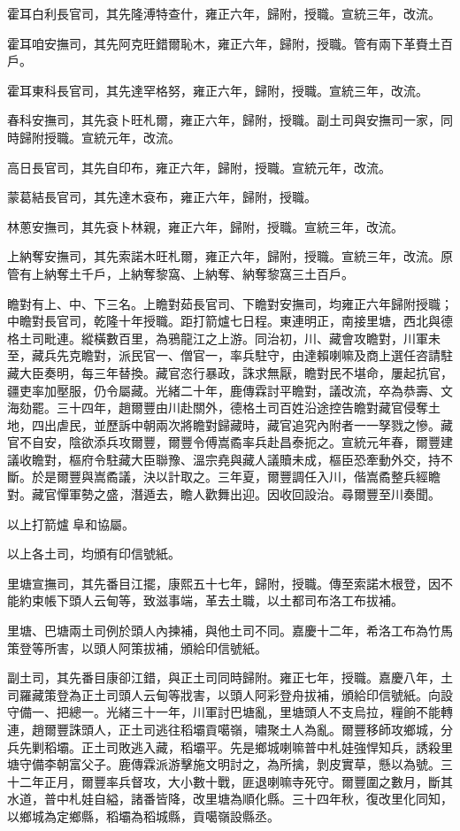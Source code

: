 \begin{pinyinscope}
霍耳白利長官司，其先隆溥特查什，雍正六年，歸附，授職。宣統三年，改流。

霍耳咱安撫司，其先阿克旺錯爾恥木，雍正六年，歸附，授職。管有兩下革賚土百戶。

霍耳東科長官司，其先達罕格努，雍正六年，歸附，授職。宣統三年，改流。

春科安撫司，其先袞卜旺札爾，雍正六年，歸附，授職。副土司與安撫司一家，同時歸附授職。宣統元年，改流。

高日長官司，其先自印布，雍正六年，歸附，授職。宣統元年，改流。

蒙葛結長官司，其先達木袞布，雍正六年，歸附，授職。

林蔥安撫司，其先袞卜林親，雍正六年，歸附，授職。宣統三年，改流。

上納奪安撫司，其先索諾木旺札爾，雍正六年，歸附，授職。宣統三年，改流。原管有上納奪土千戶，上納奪黎窩、上納奪、納奪黎窩三土百戶。

瞻對有上、中、下三名。上瞻對茹長官司、下瞻對安撫司，均雍正六年歸附授職；中瞻對長官司，乾隆十年授職。距打箭爐七日程。東連明正，南接里塘，西北與德格土司毗連。縱橫數百里，為鴉龍江之上游。同治初，川、藏會攻瞻對，川軍未至，藏兵先克瞻對，派民官一、僧官一，率兵駐守，由達賴喇嘛及商上選任咨請駐藏大臣奏明，每三年替換。藏官恣行暴政，誅求無厭，瞻對民不堪命，屢起抗官，疆吏率加壓服，仍令屬藏。光緒二十年，鹿傳霖討平瞻對，議改流，卒為恭壽、文海劾罷。三十四年，趙爾豐由川赴關外，德格土司百姓沿途控告瞻對藏官侵奪土地，四出虐民，並歷訴中朝兩次將瞻對歸藏時，藏官追究內附者一一孥戮之慘。藏官不自安，陰欲添兵攻爾豐，爾豐令傅嵩矞率兵赴昌泰扼之。宣統元年春，爾豐建議收瞻對，樞府令駐藏大臣聯豫、溫宗堯與藏人議贖未成，樞臣恐牽動外交，持不斷。於是爾豐與嵩矞議，決以計取之。三年夏，爾豐調任入川，偕嵩矞整兵經瞻對。藏官憚軍勢之盛，潛遁去，瞻人歡舞出迎。因收回設治。尋爾豐至川奏聞。

以上打箭爐阜和協屬。

以上各土司，均頒有印信號紙。

里塘宣撫司，其先番目江擺，康熙五十七年，歸附，授職。傳至索諾木根登，因不能約束帳下頭人云甸等，致滋事端，革去土職，以土都司布洛工布拔補。

里塘、巴塘兩土司例於頭人內揀補，與他土司不同。嘉慶十二年，希洛工布為竹馬策登等所害，以頭人阿策拔補，頒給印信號紙。

副土司，其先番目康卻江錯，與正土司同時歸附。雍正七年，授職。嘉慶八年，土司羅藏策登為正土司頭人云甸等戕害，以頭人阿彩登舟拔補，頒給印信號紙。向設守備一、把總一。光緒三十一年，川軍討巴塘亂，里塘頭人不支烏拉，糧餉不能轉連，趙爾豐誅頭人，正土司逃往稻壩貢噶嶺，嘯聚土人為亂。爾豐移師攻鄉城，分兵先剿稻壩。正土司敗逃入藏，稻壩平。先是鄉城喇嘛普中札娃強悍知兵，誘殺里塘守備李朝富父子。鹿傳霖派游擊施文明討之，為所擒，剝皮實草，懸以為號。三十二年正月，爾豐率兵督攻，大小數十戰，匪退喇嘛寺死守。爾豐圍之數月，斷其水道，普中札娃自縊，諸番皆降，改里塘為順化縣。三十四年秋，復改里化同知，以鄉城為定鄉縣，稻壩為稻城縣，貢噶嶺設縣丞。


\end{pinyinscope}
